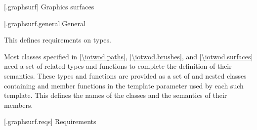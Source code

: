 
 [\iotwod.graphsurf] {Graphics surfaces}

 [\iotwod.graphsurf.general]{General}

\pnum
This \clause defines requirements on \term{\graphicssurfacestemplparamnospace} types.

\pnum
Most classes specified in \ref{\iotwod.paths}, \ref{\iotwod.brushes}, and \ref{\iotwod.surfaces} need a set of related types and functions to complete the definition of their semantics. These types and functions are provided as a set of  and nested classes containing  and  member functions in the template parameter \tcode{\graphicssurfacestemplparamnospace} used by each such template. This \clause defines the names of the classes and the semantics of their members.

 [\iotwod.graphsurf.reqs] {Requirements}








